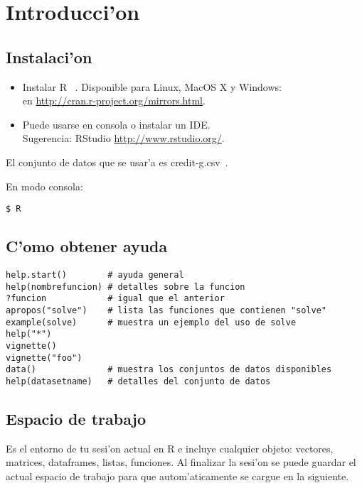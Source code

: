 \chapter{Introducci'on}

\section{Instalaci'on}
\begin{itemize}
    \item Instalar R~\cite{Rproject} . Disponible para Linux, MacOS X y Windows:\\
 en \url{http://cran.r-project.org/mirrors.html}.
    \item Puede usarse en consola o instalar un IDE.\\
Sugerencia: RStudio \url{http://www.rstudio.org/}.
\end{itemize}

El conjunto de datos que se usar'a es credit-g.csv~\cite{credit:2010}.

En modo consola:
\begin{verbatim}
$ R
\end{verbatim}

\section{C'omo obtener ayuda}
\begin{verbatim}
help.start()        # ayuda general
help(nombrefuncion) # detalles sobre la funcion
?funcion            # igual que el anterior
apropos("solve")    # lista las funciones que contienen "solve"
example(solve)      # muestra un ejemplo del uso de solve
help("*")
vignette()           
vignette("foo")     
data()              # muestra los conjuntos de datos disponibles
help(datasetname)   # detalles del conjunto de datos
\end{verbatim}

\section{Espacio de trabajo}
Es el entorno de tu sesi'on actual en R e incluye cualquier objeto: vectores, matrices, dataframes, listas, funciones. Al finalizar la sesi'on se puede guardar el actual espacio de trabajo para que autom'aticamente se cargue en la siguiente.

